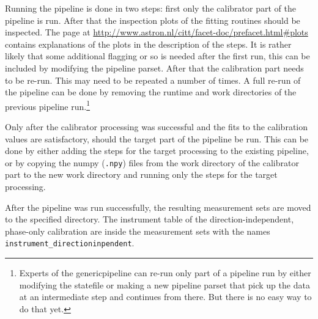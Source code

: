 Running the pipeline is done in two steps: first only the calibrator part of the pipeline is run. After that the
inspection plots of the fitting routines should be inspected. 
The page at \url{http://www.astron.nl/citt/facet-doc/prefacet.html#plots} contains explanations of the plots in 
the description of the steps. It is rather likely that some additional flagging or so is needed after the first 
run, this can be included by modifying the pipeline parset. After that the calibration part needs to be re-run. 
This may need to be repeated a number of times. A full re-run of the pipeline can be done by removing the runtime 
and work directories of the previous pipeline run.\footnote{Experts of the genericpipeline can re-run only part 
of a pipeline run by either modifying the statefile or making a new pipeline parset that pick up the data at an 
intermediate step and continues from there. But there is no easy way to do that yet.}

Only after the calibrator processing was successful and the fits to the calibration values are satisfactory, 
should the target part of the pipeline be run. This can be done by either adding the steps for the target 
processing to the existing pipeline, or by copying the numpy ({\tt *.npy}) files from the work directory of the 
calibrator part to the new work directory and running only the steps for the target processing.

After the pipeline was run successfully, the resulting measurement sets are moved to the specified directory. The
instrument table of the direction-independent, phase-only calibration are inside the measurement sets with the 
names {\tt instrument\_directioninpendent}.
